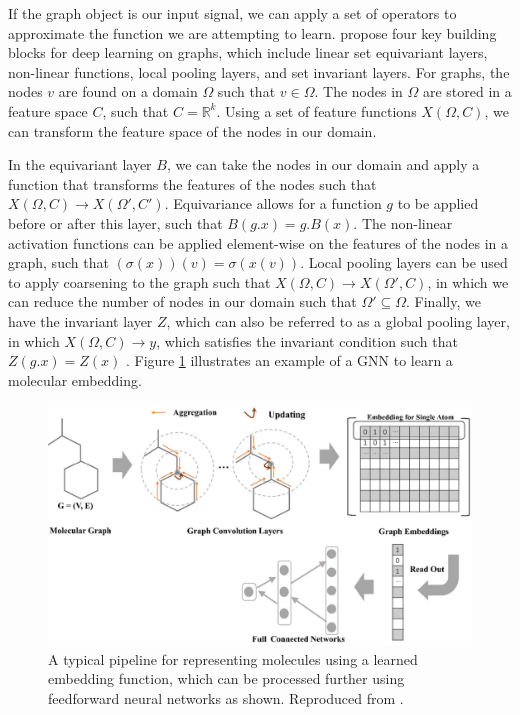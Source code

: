If the graph object is our input signal, we can apply a set of operators to approximate the function we are attempting to learn. \citet{bronstein2021geometric} propose four key building blocks for deep learning on graphs, which include linear set equivariant layers, non-linear functions, local pooling layers, and set invariant layers. For graphs, the nodes $v$ are found on a domain $\Omega$ such that $v \in \Omega$. The nodes in $\Omega$ are stored in a feature space $C$, such that $C = \mathbb{R}^k$. Using a set of feature functions $X(\Omega, C)$, we can transform the feature space of the nodes in our domain. 

In the equivariant layer $B$, we can take the nodes in our domain and apply a function that transforms the features of the nodes such that $X(\Omega, C) \rightarrow X(\Omega', C')$. Equivariance allows for a function $g$ to be applied before or after this layer, such that $B(g.x) = g.B(x)$. The non-linear activation functions can be applied element-wise on the features of the nodes in a graph, such that $(\sigma(x))(v) = \sigma(x(v))$. Local pooling layers can be used to apply coarsening to the graph such that $X(\Omega, C) \rightarrow X(\Omega', C)$, in which we can reduce the number of nodes in our domain such that $\Omega' \subseteq \Omega$. Finally, we have the invariant layer $Z$, which can also be referred to as a global pooling layer, in which $X(\Omega, C) \rightarrow y$, which satisfies the invariant condition such that $Z(g.x) = Z(x)$ \citep{bronstein2021geometric}. Figure \ref{fig:neuralgraphfingerprint} illustrates an example of a GNN to learn a molecular embedding.

\begin{figure}[h]
    \centering
    \includegraphics[width=0.9\linewidth]{img/graph_mol_embedding.png}
    \caption[Learned Embedding through a GCN]{A typical pipeline for representing molecules using a learned embedding function, which can be processed further using feedforward neural networks as shown. Reproduced from \citet{jiang2021could}.}
    \label{fig:neuralgraphfingerprint}
  \end{figure}

